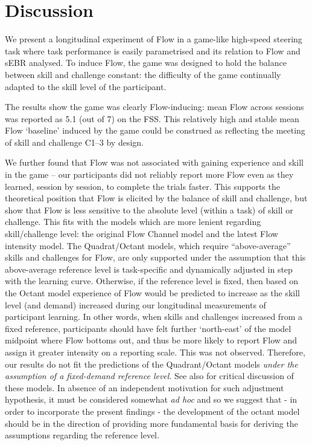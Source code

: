 \documentclass[a4paper,doc,floatsintext,natbib,10pt]{apa6}
\begin{document}
\section*{Discussion}
We present a longitudinal experiment of Flow in a game-like high-speed steering task where task performance is easily parametrised and its relation to Flow and sEBR analysed. %
To induce Flow, the game was designed to hold the balance between skill and challenge constant: the difficulty of the game continually adapted to the skill level of the participant.

The results show the game was clearly Flow-inducing: mean Flow across sessions was reported as 5.1 (out of 7) on the FSS. This relatively high and stable mean Flow `baseline' induced by the game could be construed as reflecting the meeting of skill and challenge {\sf C1--3} by design.

We further found that Flow was not associated with gaining experience and skill in the game -- our participants did not reliably report more Flow even as they learned, session by session, to complete the trials faster. This supports the theoretical position that Flow is elicited by the balance of skill and challenge, but show that Flow is less sensitive to the absolute level (within a task) of skill or challenge. This fits with the models which are more lenient regarding skill/challenge level: the original Flow Channel model and the latest Flow intensity model. The Quadrat/Octant models, which require ``above-average'' skills and challenges for Flow, are only supported under the assumption that this above-average reference level is task-specific and dynamically adjusted in step with the learning curve. Otherwise, if the reference level is fixed, then based on the Octant model experience of Flow would be predicted to increase as the skill level (and demand) increased during our longitudinal measurements of participant learning. In other words, when skills and challenges increased from a fixed reference, participants should have felt further `north-east' of the model midpoint where Flow bottoms out, and thus be more likely to report Flow and assign it greater intensity on a reporting scale. This was not observed. Therefore, our results do not fit the predictions of the Quadrant/Octant models {\it under the assumption of a fixed-demand reference level}. See also \cite{Keller2012} for critical discussion of these models. In absence of an independent motivation for such adjustment hypothesis, it must be considered somewhat {\it ad hoc} and so we suggest that - in order to incorporate the present findings - the development of the octant model should be in the direction of providing more fundamental basis for deriving the assumptions regarding the reference level.
\end{document}
